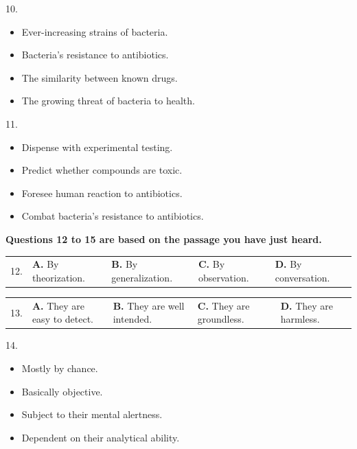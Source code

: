 \documentclass[UTF8,11pt]{ctexart}
\begin{document}
10.


\begin{itemize}[leftmargin=2em,itemsep=.2em,topsep=.4em]\item[A.] Ever-increasing strains of bacteria.
\item[B.] Bacteria's resistance to antibiotics.
\item[C.] The similarity between known drugs.
\item[D.] The growing threat of bacteria to health.
\end{itemize}

11.


\begin{itemize}[leftmargin=2em,itemsep=.2em,topsep=.4em]\item[A.] Dispense with experimental testing.
\item[B.] Predict whether compounds are toxic.
\item[C.] Foresee human reaction to antibiotics.
\item[D.] Combat bacteria's resistance to antibiotics.
\end{itemize}

\textbf{Questions 12 to 15 are based on the passage you have just heard.}


\noindent\begin{tabularx}{\linewidth}{@{}lXXXX@{}}12. & \textbf{A.} By theorization. & \textbf{B.} By generalization. & \textbf{C.} By observation. & \textbf{D.} By conversation.\\\end{tabularx}\par

\noindent\begin{tabularx}{\linewidth}{@{}lXXXX@{}}13. & \textbf{A.} They are easy to detect. & \textbf{B.} They are well intended. & \textbf{C.} They are groundless. & \textbf{D.} They are harmless.\\\end{tabularx}\par

14.


\begin{itemize}[leftmargin=2em,itemsep=.2em,topsep=.4em]\item[A.] Mostly by chance.
\item[B.] Basically objective.
\item[C.] Subject to their mental alertness.
\item[D.] Dependent on their analytical ability.
\end{itemize}
\end{document}
